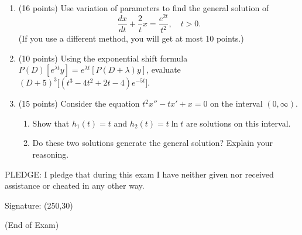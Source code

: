 \documentclass[12pt]{article}
\begin{document}
\begin{enumerate}
\begin{enumerate}
        \end{enumerate}
        

          \item (16 points) Use variation of parameters to find the general solution of
  \[
     \frac{dx}{dt} + \frac{2}{t} x = \frac{e^{2t}}{t^2}, \quad t >0.
  \]
  (If you use a different method, you will get at most 10 points.)


  \item (10 points) Using the exponential shift formula $P(D)[e^{\lambda t}y] = e^{\lambda t} [P(D+\lambda) y]$, evaluate $(D+5)^3 \big[(t^3 - 4t^2 + 2t -4) e^{-5t}\big]$.


  \item (15 points) Consider the equation $t^2 x'' - t x' + x =0$ on
    the interval $(0, \infty)$.
    \begin{enumerate}
      \item Show that $h_1(t) = t$ and $h_2(t) = t \ln t$ are
        solutions on this interval.
        \item Do these two solutions generate the
          general solution?  Explain your reasoning.
        \end{enumerate}

      \end{enumerate}

      \vfill

\noindent
PLEDGE:  I pledge that during this exam I have neither given nor received assistance or cheated in any other way.

\bigskip
\noindent
Signature: \framebox(250,30){}

\begin{center}
(End of Exam)
\end{center}

      
\end{document}
